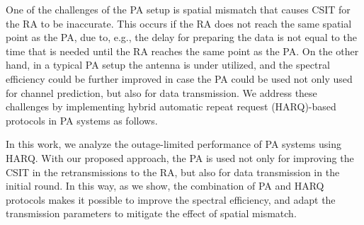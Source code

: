 One of the challenges of the PA setup is spatial mismatch that  causes CSIT for the RA to be inaccurate. This occurs if the RA does not reach the same spatial point as the PA, due to, e.g.,  the delay for preparing the data  is not equal to the time that is needed until the RA reaches the same point as the PA.  On the other hand, in a typical PA setup the antenna  is under utilized, and the spectral efficiency could be further improved in case the PA could be used not only used for channel  prediction, but also for data transmission. We address these challenges by implementing hybrid automatic repeat request (HARQ)-based protocols in PA systems as follows.



In this work, we analyze the outage-limited performance of PA systems using HARQ.   With our proposed approach, the PA is used not only for improving the CSIT in the retransmissions to the RA, but also for data transmission in the initial round. In this way, as we show,  the combination of PA and HARQ protocols makes it possible to improve the spectral efficiency, and adapt the transmission parameters to mitigate the effect of spatial mismatch.

